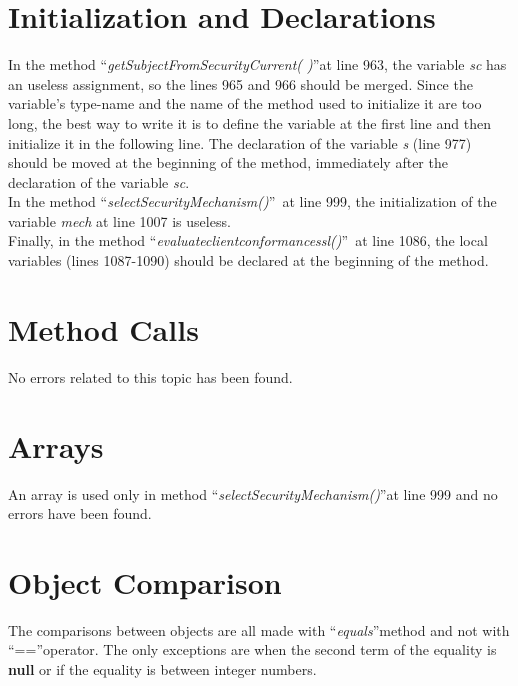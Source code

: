 \documentclass[\mainpath/main]{subfiles}
\begin{document}
\section{Initialization and Declarations}
\label{CodeInspectionChecklist:InitializationandDeclarations}
In the method \textquotedblleft \textit{getSubjectFromSecurityCurrent( )}\textquotedblright at line 963, the variable \textit{sc} has an useless assignment, so the lines 965 and 966 should be merged. Since the variable's type-name and the name of the method used to initialize it are too long, the best way to write it is to define the variable at the first line and then initialize it in the following line.
The declaration of the variable \textit{s} (line 977) should be moved at the beginning of the method, immediately after the declaration of the variable \textit{sc}.\\
In the method \textquotedblleft \textit{selectSecurityMechanism(\textellipsis)}\textquotedblright\ at line 999, the initialization of the variable \textit{mech} at line 1007 is useless.\\
Finally, in the method \textquotedblleft \textit{evaluate\textunderscore client\textunderscore conformance\textunderscore ssl(\textellipsis)}\textquotedblright\ at line 1086, the local variables (lines 1087-1090) should be declared at the beginning of the method.

\section{Method Calls}
\label{CodeInspectionChecklist:MethodCalls}
No errors related to this topic has been found.

\section{Arrays}
\label{CodeInspectionChecklist:Arrays}
An array is used only in method \textquotedblleft \textit{selectSecurityMechanism(\textellipsis)}\textquotedblright at line 999 and no errors have been found.

\section{Object Comparison}
\label{CodeInspectionChecklist:ObjectComparison}
The comparisons between objects are all made with \textquotedblleft \textit{equals}\textquotedblright method and not with \textquotedblleft ==\textquotedblright operator. The only exceptions are when the second term of the equality is \textbf{\color{javapurple} null} or if the equality is between integer numbers.
\end{document}
